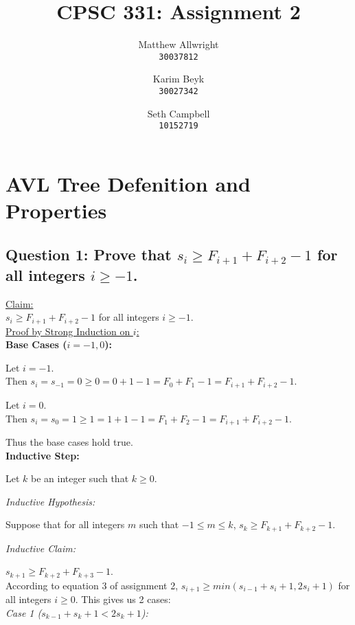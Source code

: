 \documentclass[a4paper, 12pt, titlepage]{article}
\title{CPSC 331: Assignment 2}
\author{
  Matthew Allwright\\
  \texttt{30037812}
  \and
  Karim Beyk\\
  \texttt{30027342}
  \and
  Seth Campbell\\
  \texttt{10152719}
}
\begin{document}
\maketitle

\section*{AVL Tree Defenition and Properties}

\subsection*{Question 1: Prove that $s_i \geq F_{i+1} + F_{i+2} - 1$ for all integers $i \geq -1$.}

\noindent
\underline{Claim:}\\

$s_i \geq F_{i+1} + F_{i+2} - 1$ for all integers $i \geq -1$.\\

\noindent
\underline{Proof by Strong Induction on $i$:}\\

\noindent
\textbf{Base Cases ($i = -1, 0$):}

Let $i = -1$.\\
Then $s_i = s_{-1} = 0 \geq 0 = 0 + 1 - 1 = F_0 + F_1 - 1 = F_{i+1} + F_{i+2} - 1$.

Let $i = 0$.\\
Then $s_i = s_0 = 1 \geq 1 = 1 + 1 - 1 = F_1 + F_2 - 1 = F_{i+1} + F_{i+2} - 1$.

Thus the base cases hold true.\\

\noindent
\textbf{Inductive Step:}

Let $k$ be an integer such that $k \geq 0$.

\noindent
\textit{Inductive Hypothesis:}

Suppose that for all integers $m$ such that $-1 \leq m \leq k$, $s_k \geq F_{k+1} + F_{k+2} - 1$.

\noindent
\textit{Inductive Claim:}

$s_{k+1} \geq F_{k+2} + F_{k+3} - 1$.\\

According to equation 3 of assignment 2, $s_{i+1} \geq min(s_{i-1} + s_i + 1, 2s_i + 1)$ for all integers $i \geq 0$.
This gives us 2 cases:\\

\noindent
\textit{Case 1 ($s_{k-1} + s_k + 1 < 2s_k + 1$):}
\end{document}
